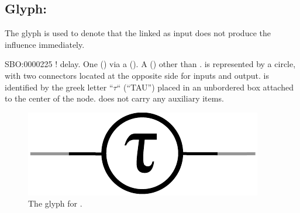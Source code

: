 
\subsection{Glyph: }\label{sec:delay}

The glyph  is used to denote that the  linked as input does not produce the influence immediately.

\begin{glyphDescription}
 \glyphSboTerm SBO:0000225 ! delay.
 \glyphOrigin One  () via a  ().
 \glyphTarget A  () other than .
 \glyphContainer {} is represented by a circle, with two connectors located at the opposite side for inputs and output.
 \glyphLabel {} is identified by the greek letter ``$\tau$`` (``TAU'') placed in an unbordered box attached to the center of the node.
 \glyphAux {} does not carry any auxiliary items.
\end{glyphDescription}

\begin{figure}[H]
  \centering
  \includegraphics[scale = 0.5]{images/build/delay.pdf}
  \caption{The \AF glyph for .}
  \label{fig:delay}
\end{figure}
\normalcolor
